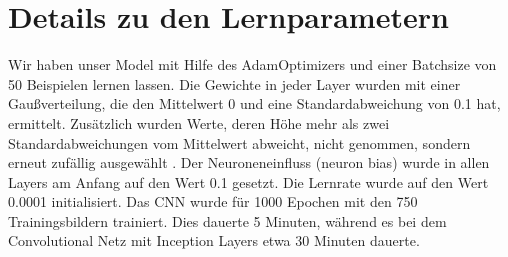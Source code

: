 \documentclass[runningheads,a4paper]{llncs}[2015/06/24]
\begin{document}
\section{Details zu den Lernparametern}
Wir haben unser Model mit Hilfe des AdamOptimizers und einer Batchsize von 50 Beispielen lernen lassen. Die Gewichte in jeder Layer wurden mit einer Gaußverteilung, die den Mittelwert 0 und eine Standardabweichung von 0.1 hat, ermittelt. Zusätzlich wurden Werte, deren Höhe mehr als zwei Standardabweichungen vom Mittelwert abweicht, nicht genommen, sondern erneut zufällig ausgewählt \cite{tensorflow}. Der Neuroneneinfluss (neuron bias) wurde in allen Layers am Anfang auf den Wert 0.1 gesetzt. Die Lernrate 
wurde auf den Wert
0.0001 initialisiert. Das CNN wurde für 1000 Epochen mit den 750 Trainingsbildern trainiert. Dies dauerte 5 Minuten, während es bei dem Convolutional Netz mit Inception Layers etwa 30 Minuten dauerte.
\end{document}

